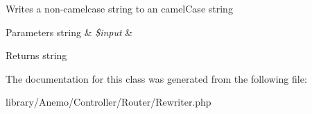 \label{class_anemo_1_1_controller_1_1_router_1_1_rewriter_ac373a9b942c85bf06e50d77072ceb503}
Writes a non-\/camelcase string to an camelCase string 
\begin{DoxyParams}[1]{Parameters}
string & {\em \$input} & \\
\hline
\end{DoxyParams}
\begin{DoxyReturn}{Returns}
string 
\end{DoxyReturn}


The documentation for this class was generated from the following file:\begin{DoxyCompactItemize}
\item 
library/Anemo/Controller/Router/Rewriter.php\end{DoxyCompactItemize}
